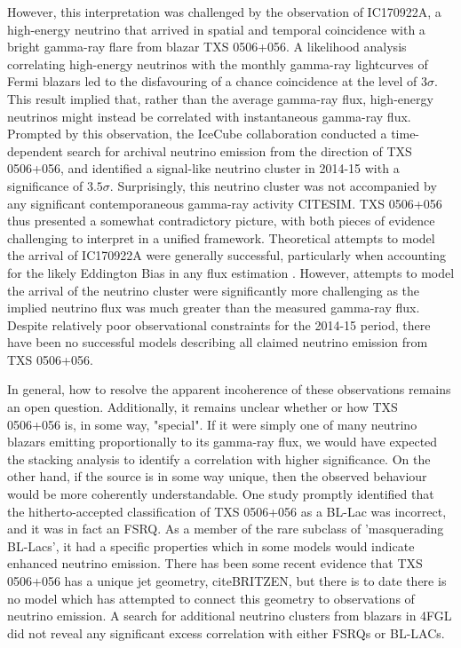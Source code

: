 \documentclass[]{article}
\begin{document}
 However, this interpretation was challenged by the observation of IC170922A, a high-energy neutrino that arrived in spatial and temporal coincidence with a bright gamma-ray flare from blazar TXS 0506+056. A likelihood analysis correlating high-energy neutrinos with the monthly gamma-ray lightcurves of Fermi blazars led to the disfavouring of a chance coincidence at the level of $3 \sigma$. This result implied that, rather than the average gamma-ray flux, high-energy neutrinos might instead be correlated with instantaneous gamma-ray flux. Prompted by this observation, the IceCube collaboration conducted a time-dependent search for archival neutrino emission from the direction of TXS 0506+056, and identified a signal-like neutrino cluster in 2014-15 with a significance of $3.5 \sigma$. Surprisingly, this neutrino cluster was not accompanied by any significant contemporaneous gamma-ray activity CITESIM. TXS 0506+056 thus presented a somewhat contradictory picture, with both pieces of evidence challenging to interpret in a unified framework. Theoretical attempts to model the arrival of IC170922A were generally successful, particularly when accounting for the likely Eddington Bias in any flux estimation . However, attempts to model the arrival of the neutrino cluster were significantly more challenging as the implied neutrino flux was much greater than the measured gamma-ray flux. Despite relatively poor observational constraints for the 2014-15 period, there have been no successful models describing all claimed neutrino emission from TXS 0506+056.
 
 In general, how to resolve the apparent incoherence of these observations remains an open question. Additionally, it remains unclear whether or how TXS 0506+056 is, in some way, "special". If it were simply one of many neutrino blazars emitting proportionally to its gamma-ray flux, we would have expected the stacking analysis to identify a correlation with higher significance.  On the other hand, if the source is in some way unique, then the observed behaviour would be more coherently understandable. One study promptly identified that the hitherto-accepted classification of TXS 0506+056 as a BL-Lac was incorrect, and it was in fact an FSRQ. As a member of the rare subclass of 'masquerading BL-Lacs', it had a specific properties which in some models would indicate enhanced neutrino emission. There has been some recent evidence that TXS 0506+056 has a unique jet geometry, citeBRITZEN, but there is to date there is no model which has attempted to connect this geometry to observations of neutrino emission. A search for additional neutrino clusters from blazars in 4FGL did not reveal any significant excess correlation with either FSRQs or BL-LACs.
 
\end{document}
